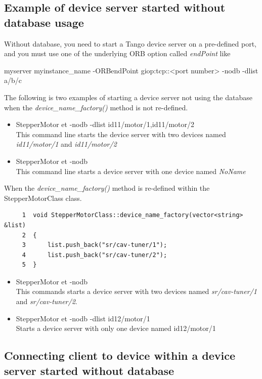 \subsection{Example of device server started without database usage}

Without database, you need to start a Tango device server on a pre-defined
port, and you must use one of the underlying ORB option
called \emph{endPoint} like \begin{center}myserver myinstance\_name
-ORBendPoint giop:tcp::<port number> -nodb -dlist a/b/c\end{center}

The following is two examples of starting a device server not using
the database when the \emph{device\_name\_factory()} method is not
re-defined.
\begin{itemize}
\item StepperMotor et -nodb -dlist id11/motor/1,id11/motor/2\\
This command line starts the device server with two devices named
\emph{id11/motor/1} and \emph{id11/motor/2}
\item StepperMotor et -nodb\\
This command line starts a device server with one device named \emph{NoName}
\end{itemize}
When the \emph{device\_name\_factory()} method is re-defined within
the StepperMotorClass class.


\begin{verbatim}
     1  void StepperMotorClass::device_name_factory(vector<string> &list)
     2  {
     3      list.push_back("sr/cav-tuner/1");
     4      list.push_back("sr/cav-tuner/2");
     5  }
\end{verbatim}

\begin{itemize}
\item StepperMotor et -nodb\\
This commands starts a device server with two devices named \emph{sr/cav-tuner/1}
and \emph{sr/cav-tuner/2}.
\item StepperMotor et -nodb -dlist id12/motor/1\\
Starts a device server with only one device named id12/motor/1
\end{itemize}

\subsection{Connecting client to device within a device server started without
database}

